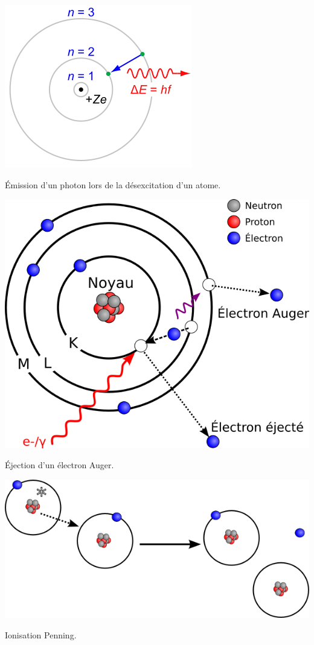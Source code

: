 \marginpar
{
	\centering
	\includegraphics[width=\marginparwidth]{RPC/Photon.png}
	\captionsetup{type=subfigure}\caption{Émission d'un photon lors de la désexcitation d'un atome.}
	\label{photon}
}
\marginpar
{
	\centering
	\includegraphics[width=\marginparwidth]{RPC/Auger.png}
	\captionsetup{type=subfigure}\caption{Éjection d'un électron Auger.}
	\label{Auger}
}
\marginpar
{
	\centering
	\includegraphics[width=\marginparwidth]{RPC/Penning.png}
	\captionsetup{type=subfigure}\caption{Ionisation Penning.}
	\label{Penning}
}
